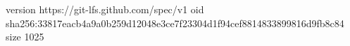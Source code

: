 version https://git-lfs.github.com/spec/v1
oid sha256:33817eacb4a9a0b259d12048e3ce7f23304d1f94cef8814833899816d9fb8c84
size 1025
